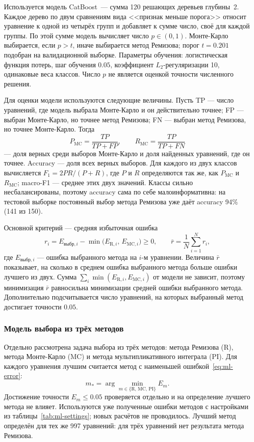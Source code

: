 \documentclass[14pt,a4paper]{extarticle}
\begin{document}
Используется модель CatBoost~--- сумма 120 решающих деревьев глубины~2.
Каждое дерево по двум сравнениям вида <<признак меньше порога>> относит
уравнение к одной из четырёх групп и добавляет к сумме число, своё
для каждой группы. По этой сумме модель вычисляет число $p\in(0,1)$.
Монте-Карло выбирается, если $p>t$, иначе выбирается метод Ремизова;
порог $t=0.201$ подобран на валидационной выборке. Параметры обучения:
логистическая функция потерь, шаг обучения $0.05$, коэффициент
$L_2$-регуляризации 10, одинаковые веса классов. Число $p$ не является
оценкой точности численного решения.

Для оценки модели используются следующие величины. Пусть TP --- число
уравнений, где модель выбрала Монте-Карло и он действительно точнее;
FP --- выбран Монте-Карло, но точнее метод Ремизова; FN --- выбран метод
Ремизова, но точнее Монте-Карло. Тогда
\[
P_{\mathrm{MC}}=\frac{TP}{TP+FP},\qquad R_{\mathrm{MC}}=\frac{TP}{TP+FN}
\]
--- доля верных среди выборов Монте-Карло и доля найденных уравнений,
где он точнее. Accuracy --- доля всех верных выборов. Для каждого
из двух классов вычисляется $F_1=2PR/(P+R)$, где $P$ и $R$ определяются
так же, как $P_{\mathrm{MC}}$ и $R_{\mathrm{MC}}$; macro-F1 --- среднее
этих двух значений. Классы сильно несбалансированы, поэтому accuracy
сама по себе малоинформативна: на тестовой выборке постоянный выбор
метода Ремизова уже даёт accuracy 94\% (141 из 150).

Основной критерий --- средняя избыточная ошибка
\begin{equation}\label{eq:ml-regret}
r_i=E_{\text{выбр},i}-\min\bigl(E_{\mathrm{R},i},\,E_{\mathrm{MC},i}\bigr)\ge0,\qquad
\bar r=\frac1N\sum_{i=1}^N r_i,
\end{equation}
где $E_{\text{выбр},i}$ --- ошибка выбранного метода на $i$-м уравнении.
Величина $\bar r$ показывает, на сколько в среднем ошибка выбранного
метода больше ошибки лучшего из двух. Сумма
$\sum_i\min(E_{\mathrm{R},i},E_{\mathrm{MC},i})$ от модели не зависит,
поэтому минимизация $\bar r$ равносильна минимизации средней ошибки
выбранного метода. Дополнительно подсчитывается число уравнений,
на которых выбранный метод достигает точности $0.05$.

\subsubsection{Модель выбора из трёх методов}\label{sec:ml3-setup}
Отдельно рассмотрена задача выбора из трёх методов: метода Ремизова
($\mathrm{R}$), метода Монте-Карло ($\mathrm{MC}$) и метода
мультипликативного интеграла ($\mathrm{PI}$). Для каждого уравнения
лучшим считается метод с наименьшей ошибкой~\eqref{eq:ml-error}:
\[
m_*=\arg\min_{m\in\{\mathrm{R},\,\mathrm{MC},\,\mathrm{PI}\}}E_m .
\]
Достижение точности $E_m\le0.05$ проверяется отдельно и на определение
лучшего метода не влияет. Используются уже полученные ошибки методов
с настройками из таблицы~\ref{tab:ml-settings}; новых расчётов
не проводилось. Лучший метод определён для тех же 997 уравнений: для трёх
уравнений нет результата метода Ремизова.
\end{document}
